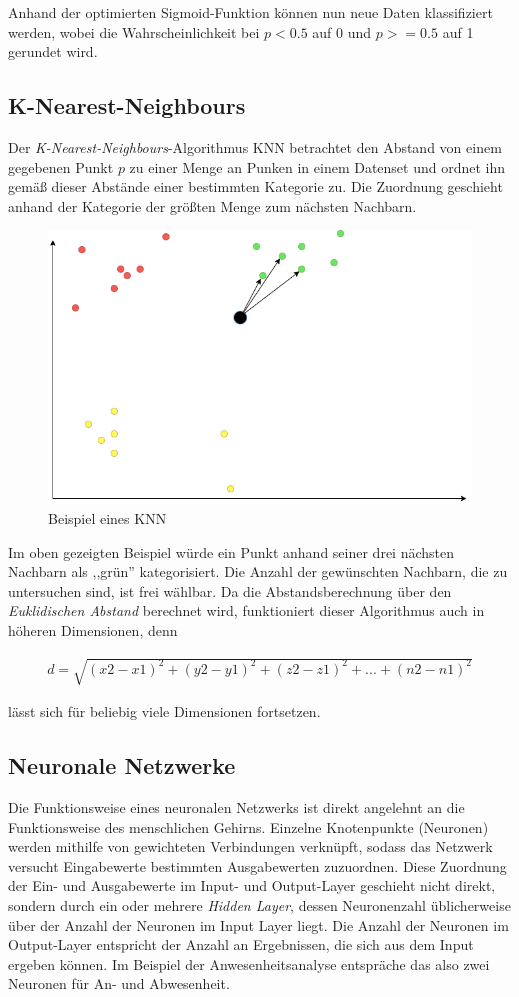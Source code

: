 Anhand der optimierten Sigmoid-Funktion können nun neue Daten klassifiziert werden, wobei die Wahrscheinlichkeit
bei $p < 0.5$ auf 0 und $p >= 0.5$ auf 1 gerundet wird.
\newpage
\subsection{K-Nearest-Neighbours}
Der \textit{K-Nearest-Neighbours}-Algorithmus KNN betrachtet den Abstand von einem gegebenen Punkt $p$ zu einer 
Menge an Punken in einem Datenset und ordnet ihn gemäß dieser Abstände einer bestimmten Kategorie zu. Die 
Zuordnung geschieht anhand der Kategorie der größten Menge zum nächsten Nachbarn.

\begin{figure}[h]
    \centering
    \includegraphics[width=12.0cm]{pic/KNN.png}
    \caption{Beispiel eines KNN}
    \label{fig:KNN}
\end{figure}

Im oben gezeigten Beispiel würde ein Punkt anhand seiner drei nächsten Nachbarn als ,,grün'' kategorisiert.
Die Anzahl der gewünschten Nachbarn, die zu untersuchen sind, ist frei wählbar.
Da die Abstandsberechnung über den \textit{Euklidischen Abstand} berechnet wird, funktioniert dieser 
Algorithmus auch in höheren Dimensionen, denn

\begin{align}
    d = \sqrt{(x2 - x1)^2 + (y2 - y1)^2 + (z2 - z1)^2 + ... + (n2 - n1)^2}
\end{align}

lässt sich für beliebig viele Dimensionen fortsetzen.
\newpage
\subsection{Neuronale Netzwerke}
Die Funktionsweise eines neuronalen Netzwerks ist direkt angelehnt an die Funktionsweise des menschlichen Gehirns.
Einzelne Knotenpunkte (Neuronen) werden mithilfe von gewichteten Verbindungen verknüpft, sodass das Netzwerk versucht 
Eingabewerte bestimmten Ausgabewerten zuzuordnen. Diese Zuordnung der Ein- und Ausgabewerte im Input- und Output-Layer 
geschieht nicht direkt, sondern durch ein oder mehrere \textit{Hidden Layer}, dessen Neuronenzahl üblicherweise über 
der Anzahl der Neuronen im Input Layer liegt. Die Anzahl der Neuronen im Output-Layer entspricht der Anzahl an Ergebnissen, 
die sich aus dem Input ergeben können. Im Beispiel der Anwesenheitsanalyse entspräche das also zwei Neuronen für 
An- und Abwesenheit.

